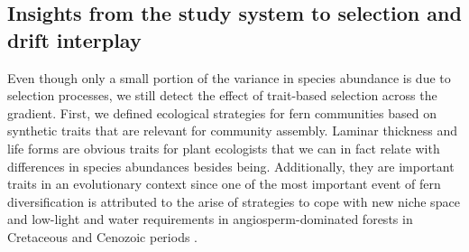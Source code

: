 \documentclass[12pt]{article}
\begin{document}

\subsection*{Insights from the study system to selection and drift interplay}

Even though only a small portion of the variance in species abundance is due to selection processes, we still detect the effect of trait-based selection across the gradient. First, we defined ecological strategies for fern communities based on synthetic traits that are relevant for community assembly. Laminar thickness and life forms are obvious traits for plant ecologists that we can in fact relate with differences in species abundances besides being. Additionally, they are important traits in an evolutionary context since one of the most important event of fern diversification is attributed to the arise of strategies to cope with new niche space and low-light and water requirements in angiosperm-dominated forests in Cretaceous and Cenozoic periods \citep{Schneider2004, Schuettpelz2009}. 
\end{document}
